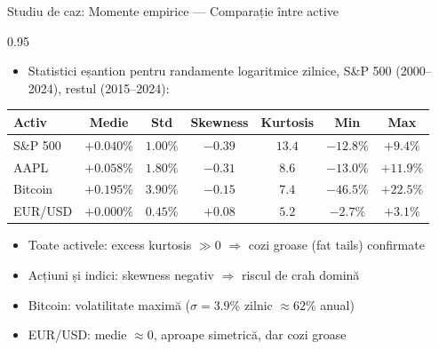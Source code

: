 \documentclass[9pt, aspectratio=169, t]{beamer}
\begin{document}
\begin{frame}{Studiu de caz: Momente empirice --- Comparație între active}
    \begin{cminipage}{0.95\textwidth}
    \begin{itemize}\setlength{\itemsep}{0pt}
        \item Statistici eșantion pentru randamente logaritmice zilnice, S\&P 500 (2000--2024), restul (2015--2024):
    \end{itemize}
    \vspace{0.1cm}
    \begin{center}
    {\small
    \renewcommand{\arraystretch}{1.3}
    \begin{tabular}{lcccccc}
    \toprule
    \textbf{Activ} & \textbf{Medie} & \textbf{Std} & \textbf{Skewness} & \textbf{Kurtosis} & \textbf{Min} & \textbf{Max} \\
    \midrule
    S\&P 500 & $+0.040\%$ & $1.00\%$ & $-0.39$ & $13.4$ & $-12.8\%$ & $+9.4\%$ \\
    AAPL     & $+0.058\%$ & $1.80\%$ & $-0.31$ & $8.6$  & $-13.0\%$ & $+11.9\%$ \\
    Bitcoin  & $+0.195\%$ & $3.90\%$ & $-0.15$ & $7.4$  & $-46.5\%$ & $+22.5\%$ \\
    EUR/USD  & $+0.000\%$ & $0.45\%$ & $+0.08$ & $5.2$  & $-2.7\%$  & $+3.1\%$ \\
    \bottomrule
    \end{tabular}
    }
    \end{center}
    \vspace{0.1cm}
    \begin{itemize}\setlength{\itemsep}{0pt}
        \item Toate activele: excess kurtosis $\gg 0$ $\Rightarrow$ cozi groase (fat tails) confirmate
        \item Acțiuni și indici: skewness negativ $\Rightarrow$ riscul de crah domină
        \item Bitcoin: volatilitate maximă ($\sigma = 3.9\%$ zilnic $\approx 62\%$ anual)
        \item EUR/USD: medie $\approx 0$, aproape simetrică, dar cozi groase
    \end{itemize}
    \end{cminipage}
\end{frame}

\end{document}
